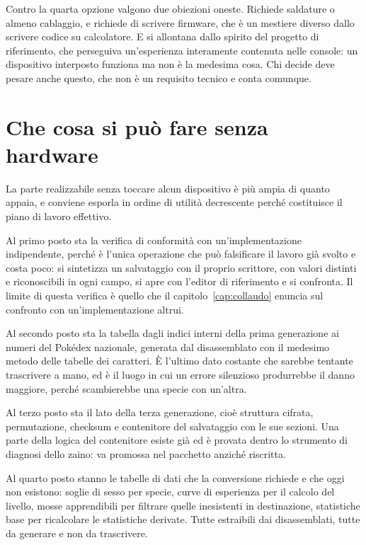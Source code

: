 Contro la quarta opzione valgono due obiezioni oneste. Richiede saldature o almeno cablaggio, e richiede di scrivere firmware, che è un mestiere diverso dallo scrivere codice su calcolatore. E si allontana dallo spirito del progetto di riferimento, che perseguiva un'esperienza interamente contenuta nelle console: un dispositivo interposto funziona ma non è la medesima cosa. Chi decide deve pesare anche questo, che non è un requisito tecnico e conta comunque.

\section{Che cosa si può fare senza hardware}

La parte realizzabile senza toccare alcun dispositivo è più ampia di quanto appaia, e conviene esporla in ordine di utilità decrescente perché costituisce il piano di lavoro effettivo.

Al primo posto sta la verifica di conformità con un'implementazione indipendente, perché è l'unica operazione che può falsificare il lavoro già svolto e costa poco: si sintetizza un salvataggio con il proprio scrittore, con valori distinti e riconoscibili in ogni campo, si apre con l'editor di riferimento e si confronta. Il limite di questa verifica è quello che il capitolo~\ref{cap:collaudo} enuncia sul confronto con un'implementazione altrui.

Al secondo posto sta la tabella dagli indici interni della prima generazione ai numeri del Pokédex nazionale, generata dal disassemblato con il medesimo metodo delle tabelle dei caratteri. È l'ultimo dato costante che sarebbe tentante trascrivere a mano, ed è il luogo in cui un errore silenzioso produrrebbe il danno maggiore, perché scambierebbe una specie con un'altra.

Al terzo posto sta il lato della terza generazione, cioè struttura cifrata, permutazione, checksum e contenitore del salvataggio con le sue sezioni. Una parte della logica del contenitore esiste già ed è provata dentro lo strumento di diagnosi dello zaino: va promossa nel pacchetto anziché riscritta.

Al quarto posto stanno le tabelle di dati che la conversione richiede e che oggi non esistono: soglie di sesso per specie, curve di esperienza per il calcolo del livello, mosse apprendibili per filtrare quelle inesistenti in destinazione, statistiche base per ricalcolare le statistiche derivate. Tutte estraibili dai disassemblati, tutte da generare e non da trascrivere.

